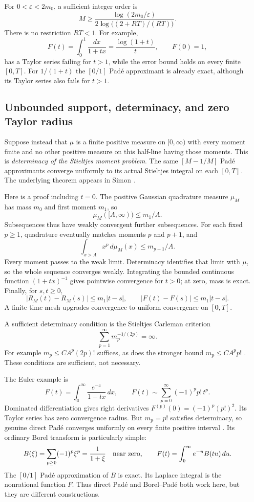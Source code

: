 For $0<\varepsilon<2m_0$, a sufficient integer order is
\[
 M\ge\frac{\log(2m_0/\varepsilon)}
 {2\log\bigl((2+RT)/(RT)\bigr)}.
\]
There is no restriction $RT<1$. For example,
\[
 F(t)=\int_0^1\frac{dx}{1+tx}
 =\frac{\log(1+t)}{t},\qquad F(0)=1,
\]
has a Taylor series failing for $t>1$, while the error bound holds on
every finite $[0,T]$. For $1/(1+t)$ the $[0/1]$ Pad\'e approximant
is already exact, although its Taylor series also fails for $t>1$.

\subsection{Unbounded support, determinacy, and zero Taylor radius}
\label{app:determinate-stieltjes}

Suppose instead that $\mu$ is a finite positive measure on $[0,\infty)$
with every moment finite and no other positive measure on this half-line
having those moments. This is \emph{determinacy of the Stieltjes moment
problem}. The same $[M-1/M]$ Pad\'e approximants converge uniformly
to its actual Stieltjes integral on each $[0,T]$. The underlying theorem
appears in Simon \cite[Theorem 6]{SimonMoments}.

Here is a proof including $t=0$. The positive Gaussian quadrature
measure $\mu_M$ has mass $m_0$ and first moment $m_1$, so
\[
 \mu_M([A,\infty))\le m_1/A.
\]
Subsequences thus have weakly convergent further subsequences. For each
fixed $p\ge1$, quadrature eventually matches moments $p$ and $p+1$, and
\[
 \int_{x>A}x^p\,d\mu_M(x)\le m_{p+1}/A.
\]
Every moment passes to the weak limit. Determinacy identifies that
limit with $\mu$, so the whole sequence converges weakly. Integrating
the bounded continuous function $(1+tx)^{-1}$ gives pointwise convergence
for $t>0$; at zero, mass is exact. Finally, for $s,t\ge0$,
\[
 |R_M(t)-R_M(s)|\le m_1|t-s|,
 \qquad |F(t)-F(s)|\le m_1|t-s|.
\]
A finite time mesh upgrades convergence to uniform convergence on $[0,T]$.

A sufficient determinacy condition is the Stieltjes Carleman criterion
\[
 \sum_{p=1}^{\infty}m_p^{-1/(2p)}=\infty.
\]
For example $m_p\le C A^p(2p)!$ suffices, as does the stronger bound
$m_p\le C A^p p!$ \cite{SimonMoments,BorghiWeniger}.
These conditions are sufficient, not necessary.

The Euler example is
\[
 F(t)=\int_0^\infty\frac{e^{-x}}{1+tx}\,dx,
 \qquad F(t)\sim\sum_{p=0}^{\infty}(-1)^p p!\,t^p.
\]
Dominated differentiation gives right derivatives
$F^{(p)}(0)=(-1)^p(p!)^2$. Its Taylor series has zero convergence radius.
But $m_p=p!$ satisfies determinacy, so genuine direct Pad\'e converges
uniformly on every finite positive interval \cite{BorghiWeniger}.
Its ordinary Borel transform is particularly simple:
\[
 B(\xi)=\sum_{p\ge0}(-1)^p\xi^p=\frac1{1+\xi}
 \quad\hbox{near zero},\qquad
 F(t)=\int_0^\infty e^{-u}B(tu)\,du.
\]
The $[0/1]$ Pad\'e approximation of $B$ is exact. Its Laplace integral
is the nonrational function $F$. Thus direct Pad\'e and Borel--Pad\'e
both work here, but they are different constructions.

